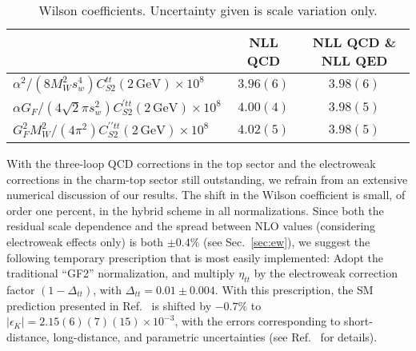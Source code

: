 \documentclass[letter,11pt,DIV=12,abstract=true,numbers=noenddot,titlepage=false,twocolumn=false,draft=false]{scrartcl}
\begin{document}
\begin{table}
  \centering
  \begin{tabular}{|l|c|c|}
    \hline
     & NLL QCD & NLL QCD \& NLL QED \\\hline
     $ \alpha^2/(8M_W^2 s_w^4) C_{S2}^{tt}(2\,\text{GeV}) \times 10^{8}$ & $3.96(6)$ & $3.98(6)$ \\\hline
     $ \alpha G_F/(4\sqrt{2}\pi s_w^2) C_{S2}^{\prime tt}(2\,\text{GeV}) \times 10^{8}$ & $4.00(4)$ & $3.98(5)$ \\\hline
     $ G_F^2 M_W^2/(4\pi^2) C_{S2}^{\prime \prime tt}(2\,\text{GeV}) \times 10^{8}$ & $4.02(5)$ &$3.98(5)$ \\\hline
  \end{tabular}
  \caption{Wilson coefficients. Uncertainty given is scale variation only.
    \label{tab:WC}}
\end{table}




With the three-loop QCD corrections in the top sector and the
electroweak corrections in the charm-top sector still outstanding, we
refrain from an extensive numerical discussion of our results. The
shift in the Wilson coefficient is small, of order one percent, in the
hybrid scheme in all normalizations. Since both the residual scale
dependence and the spread between NLO values (considering electroweak
effects only) is both $\pm 0.4\%$ (see Sec.~\ref{sec:ew}), we suggest
the following temporary prescription that is most easily implemented:
Adopt the traditional ``GF2'' normalization, and multiply $\eta_{tt}$
by the electroweak correction factor $(1-\Delta_{tt})$, with
$\Delta_{tt} = 0.01 \pm 0.004$. With this prescription, the SM
prediction presented in Ref.~\cite{Brod:2019rzc} is shifted by
$-0.7\%$ to $|\epsilon_K| = 2.15(6)(7)(15) \times 10^{-3}$, with the
errors corresponding to short-distance, long-distance, and parametric
uncertainties (see Ref.~\cite{Brod:2019rzc} for details).
\end{document}
